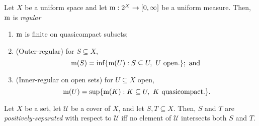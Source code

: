 \begin{dfn}\label{RegularMeasure}
Let $X$ be a uniform space and let $\mathrm{m} :2^X\rightarrow [0,\infty ]$ be a uniform measure.  Then, $\mathrm{m}$ is \emph{regular}
\begin{enumerate}
\item $\mathrm{m}$ is finite on quasicompact subsets;
\item (Outer-regular) for $S\subseteq X$,
\begin{equation}
\meas (S)=\inf \{ \meas (U):S\subseteq U,\ U\text{ open.}\} ;\text{ and }
\end{equation}
\item (Inner-regular on open sets) for $U\subseteq X$ open,
\begin{equation}
\mathrm{m} (U)=\sup \{ \mathrm{m} (K):K\subseteq U,\ K\text{ quasicompact.}\} .
\end{equation}
\end{enumerate}
\end{dfn}
\begin{dfn}\label{PositivelySeparated}
Let $X$ be a set, let $\mathcal{U}$ be a cover of $X$, and let $S,T\subseteq X$.  Then, $S$ and $T$ are \emph{positively-separated} with respect to $\mathcal{U}$ iff no element of $\mathcal{U}$ intersects both $S$ and $T$.
\end{dfn}

